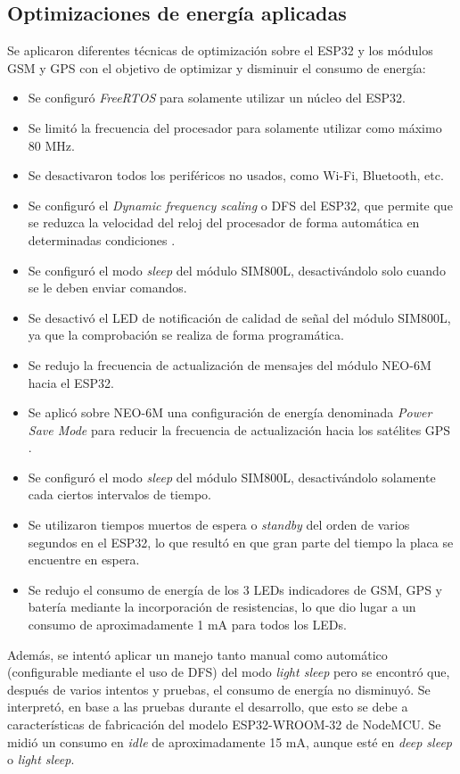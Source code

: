 \subsection{Optimizaciones de energía aplicadas}

Se aplicaron diferentes técnicas de optimización sobre el ESP32 y los módulos GSM y GPS con el objetivo de optimizar y disminuir el consumo de energía:
\begin{itemize}
	\item Se configuró \textit{FreeRTOS} para solamente utilizar un núcleo del ESP32.
	\item Se limitó la frecuencia del procesador para solamente utilizar como máximo 80 MHz.
	\item Se desactivaron todos los periféricos no usados, como Wi-Fi, Bluetooth, etc.
	\item Se configuró el \textit{Dynamic frequency scaling} o DFS del ESP32, que permite que se reduzca la velocidad del reloj del procesador de forma automática en determinadas condiciones \citep{ESP32:2}.
	\item Se configuró el modo \textit{sleep} del módulo SIM800L, desactivándolo solo cuando se le deben enviar comandos.
	\item Se desactivó el LED de notificación de calidad de señal del módulo SIM800L, ya que la comprobación se realiza de forma programática.
	\item Se redujo la frecuencia de actualización de mensajes del módulo NEO-6M hacia el ESP32.
	\item Se aplicó sobre NEO-6M una configuración de energía denominada \textit{Power Save Mode} para reducir la frecuencia de actualización hacia los satélites GPS \citep{NEO6M:2}.
	\item Se configuró el modo \textit{sleep} del módulo SIM800L, desactivándolo solamente cada ciertos intervalos de tiempo.
	\item Se utilizaron tiempos muertos de espera o \textit{standby} del orden de varios segundos en el ESP32, lo que resultó en que gran parte del tiempo la placa se encuentre en espera.
	\item Se redujo el consumo de energía de los 3 LEDs indicadores de GSM, GPS y batería mediante la incorporación de resistencias, lo que dio lugar a un consumo de aproximadamente 1 mA para todos los LEDs.
\end{itemize}

Además, se intentó aplicar un manejo tanto manual como automático (configurable mediante el uso de DFS) del modo \textit{light sleep} pero se encontró que, después de varios intentos y pruebas, el consumo de energía no disminuyó. Se interpretó, en base a las pruebas durante el desarrollo, que esto se debe a características de fabricación del modelo ESP32-WROOM-32 de NodeMCU. Se midió un consumo en \textit{idle} de aproximadamente 15 mA, aunque esté en \textit{deep sleep} o \textit{light sleep}.


